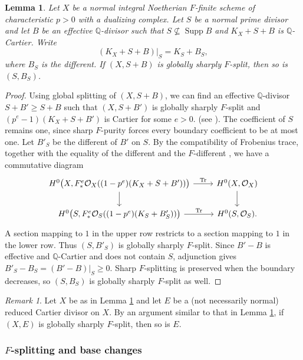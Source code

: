 \documentclass[12pt]{amsart}
\def\Supp{\operatorname{Supp}}
\newcommand{\Q}{\mathbb{Q}}
\newcommand{\sO}{\mathcal{O}}
\theoremstyle{plain}
\newtheorem{lem}[thm]{Lemma}
\theoremstyle{definition}
\theoremstyle{remark}
\newtheorem{rem}[thm]{Remark}
\newtheorem{defn and notation}[thm]{Definition and Notation}
\theoremstyle{plain}
\numberwithin{equation}{thm}
\begin{document}
\begin{lem}\label{lem:adjunction}
    Let $X$ be a normal integral Noetherian $F$-finite scheme of characteristic $p>0$ with a dualizing complex.
    Let $S$ be a normal prime divisor and let $B$ be an effective $\Q$-divisor such that
    $S\not\subseteq\Supp B$ and $K_X+S+B$ is $\Q$-Cartier.
    Write
    \[
    (K_X+S+B)|_S=K_S+B_S,
    \]
    where $B_S$ is the different.
    If $(X,S+B)$ is globally sharply $F$-split, then so is $(S,B_S)$.
\end{lem}
\begin{proof}
Using global splitting of $(X,S+B)$, we can find an effective $\Q$-divisor
$S+B'\geq S+B$ such that $(X,S+B')$ is globally sharply $F$-split and
$(p^e-1)(K_X+S+B')$ is Cartier for some $e>0$.
(see \cite[proof of Theorem 4.3(ii)]{SS10}).
The coefficient of $S$ remains one, since sharp $F$-purity forces every boundary coefficient to be at most one.
Let $B'_S$ be the different of $B'$ on $S$.
By the compatibility of Frobenius trace, together with the equality of the different and the $F$-different
\cite[Theorem 5.3]{Das15}, we have a commutative diagram
\[
\begin{tikzcd}
H^0\bigl(X,F_*^e\sO_X((1-p^e)(K_X+S+B'))\bigr)
 \arrow[r,"\operatorname{Tr}"]\arrow[d]
 & H^0(X,\sO_X)\arrow[d]\\
H^0\bigl(S,F_*^e\sO_S((1-p^e)(K_S+B'_S))\bigr)
 \arrow[r,"\operatorname{Tr}"]
 & H^0(S,\sO_S).
\end{tikzcd}
\]
A section mapping to $1$ in the upper row restricts to a section mapping to $1$ in the lower row.
Thus $(S,B'_S)$ is globally sharply $F$-split.
Since $B'-B$ is effective and $\Q$-Cartier and does not contain $S$, adjunction gives
$B'_S-B_S=(B'-B)|_S\geq0$.
Sharp $F$-splitting is preserved when the boundary decreases, so $(S,B_S)$ is globally sharply $F$-split as well.
\end{proof}



\begin{rem}\label{rem:non-normal adjunction}
Let $X$ be as in Lemma \ref{lem:adjunction} and let $E$ be a (not necessarily normal) reduced Cartier divisor on $X$.
By an argument similar to that in Lemma \ref{lem:adjunction}, if $(X,E)$ is globally sharply $F$-split, then so is $E$.
\end{rem}


\subsubsection{\texorpdfstring{$F$}{F}-splitting and base changes}
\end{document}
